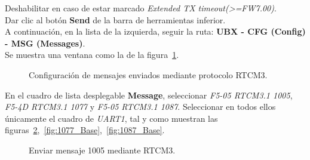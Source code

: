 Deshabilitar en caso de estar marcado \textit{Extended TX timeout(>=FW7.00)}.\\

Dar clic al botón \textbf{Send} de la barra de herramientas inferior.\\

A continuación, en la lista de la izquierda, seguir la ruta: \textbf{UBX - CFG (Config) - MSG (Messages)}. \\

Se muestra una ventana como la de la figura~\ref{fig:Mes_Base}. 

\begin{figure}[H] %
\caption{Configuración de mensajes enviados mediante protocolo RTCM3.}
\label{fig:Mes_Base}
\end{figure}

En el cuadro de lista desplegable \textbf{Message}, seleccionar \textit{F5-05 RTCM3.1 1005}, \textit{F5-4D RTCM3.1 1077} y \textit{F5-05 RTCM3.1 1087}. Seleccionar en todos ellos únicamente el cuadro de \textit{UART1}, tal y como muestran las figuras~\ref{fig:1005_Base},~\ref{fig:1077_Base},~\ref{fig:1087_Base}.

\begin{figure}[H] %
\caption{Enviar mensaje 1005 mediante RTCM3.}
\label{fig:1005_Base}
\end{figure}

